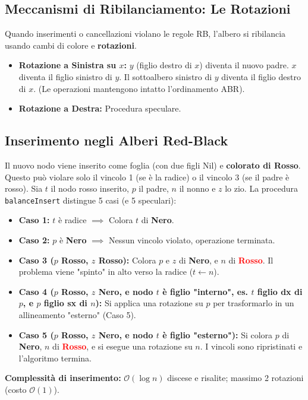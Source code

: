 \documentclass[12pt, a4paper]{article}
\begin{document}
\subsection{Meccanismi di Ribilanciamento: Le Rotazioni}
Quando inserimenti o cancellazioni violano le regole RB, l'albero si ribilancia usando cambi di colore e \textbf{rotazioni}.
\begin{itemize}
\item \textbf{Rotazione a Sinistra su $x$:} $y$ (figlio destro di $x$) diventa il nuovo padre. $x$ diventa il figlio sinistro di $y$. Il sottoalbero sinistro di $y$ diventa il figlio destro di $x$. (Le operazioni mantengono intatto l'ordinamento ABR).
\item \textbf{Rotazione a Destra:} Procedura speculare.
\end{itemize}

\subsection{Inserimento negli Alberi Red-Black}
Il nuovo nodo viene inserito come foglia (con due figli Nil) e \textbf{colorato di Rosso}. Questo può violare solo il vincolo 1 (se è la radice) o il vincolo 3 (se il padre è rosso).
Sia $t$ il nodo rosso inserito, $p$ il padre, $n$ il nonno e $z$ lo zio. La procedura \texttt{balanceInsert} distingue 5 casi (e 5 speculari):

\begin{itemize}
\item \textbf{Caso 1:} $t$ è radice $\implies$ Colora $t$ di \textbf{Nero}.
\item \textbf{Caso 2:} $p$ è \textbf{Nero} $\implies$ Nessun vincolo violato, operazione terminata.
\item \textbf{Caso 3 ($p$ Rosso, $z$ Rosso):} Colora $p$ e $z$ di \textbf{Nero}, e $n$ di \textcolor{red}{\textbf{Rosso}}. Il problema viene "spinto" in alto verso la radice ($t \leftarrow n$).
\item \textbf{Caso 4 ($p$ Rosso, $z$ Nero, e nodo $t$ è figlio "interno", es. $t$ figlio dx di $p$, e $p$ figlio sx di $n$):} Si applica una rotazione su $p$ per trasformarlo in un allineamento "esterno" (Caso 5).
\item \textbf{Caso 5 ($p$ Rosso, $z$ Nero, e nodo $t$ è figlio "esterno"):} Si colora $p$ di \textbf{Nero}, $n$ di \textcolor{red}{\textbf{Rosso}}, e si esegue una rotazione su $n$. I vincoli sono ripristinati e l'algoritmo termina.
\end{itemize}
\textbf{Complessità di inserimento:} $\mathcal{O}(\log n)$ discese e risalite; massimo 2 rotazioni (costo $\mathcal{O}(1)$).
\end{document}
